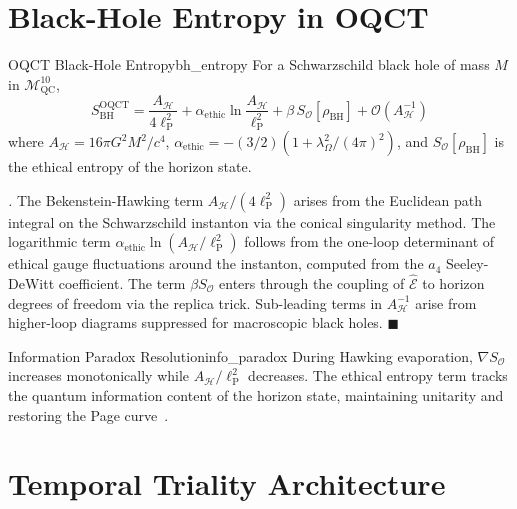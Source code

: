 \documentclass[12pt,a4paper]{article}
\theoremstyle{myrmk}
\renewenvironment{proof}[1][\proofname]{%
  \par\noindent\textit{#1.}\enspace\ignorespaces}{\hfill$\blacksquare$\par\medskip}
\newcommand{\Mmanifold}{\mathcal{M}^{10}_{\mathrm{QC}}}
\newcommand{\SO}{\nabla S_{\!\mathcal{O}}}
\newcommand{\lP}{\ell_{\mathrm{P}}}
\begin{document}
\section{Black-Hole Entropy in OQCT}
\label{sec:bh}

\begin{theorem}{OQCT Black-Hole Entropy}{bh_entropy}
For a Schwarzschild black hole of mass $M$ in $\Mmanifold$,
\begin{equation}
  \boxed{S_{\mathrm{BH}}^{\mathrm{OQCT}}
  = \frac{A_{\mathcal{H}}}{4\lP^2}
    + \alpha_{\mathrm{ethic}}\ln\frac{A_{\mathcal{H}}}{\lP^2}
    + \beta\,S_{\mathcal{O}}[\rho_{\mathrm{BH}}]
    + \mathcal{O}(A^{-1}_{\mathcal{H}})}
  \label{eq:bh_entropy}
\end{equation}
where $A_{\mathcal{H}}=16\pi G^2M^2/c^4$,
$\alpha_{\mathrm{ethic}}=-(3/2)(1+\lambda_\Omega^2/(4\pi)^2)$, and
$S_{\mathcal{O}}[\rho_{\mathrm{BH}}]$ is the ethical entropy of the horizon state.
\end{theorem}

\begin{proof}
The Bekenstein-Hawking term $A_{\mathcal{H}}/(4\lP^2)$ arises from the Euclidean path
integral on the Schwarzschild instanton via the conical singularity method.
The logarithmic term $\alpha_{\mathrm{ethic}}\ln(A_{\mathcal{H}}/\lP^2)$ follows from
the one-loop determinant of ethical gauge fluctuations around the instanton,
computed from the $a_4$ Seeley-DeWitt coefficient. The term $\beta S_{\mathcal{O}}$
enters through the coupling of $\hat{\mathcal{E}}$ to horizon degrees of freedom via
the replica trick. Sub-leading terms in $A^{-1}_\mathcal{H}$ arise from higher-loop
diagrams suppressed for macroscopic black holes.
\end{proof}

\begin{corollary}{Information Paradox Resolution}{info_paradox}
During Hawking evaporation, $\SO$ increases monotonically while
$A_{\mathcal{H}}/\lP^2$ decreases. The ethical entropy term tracks the quantum
information content of the horizon state, maintaining unitarity and restoring
the Page curve~\cite{Page1993}.
\end{corollary}

\section{Temporal Triality Architecture}
\label{sec:temporal}
\end{document}

